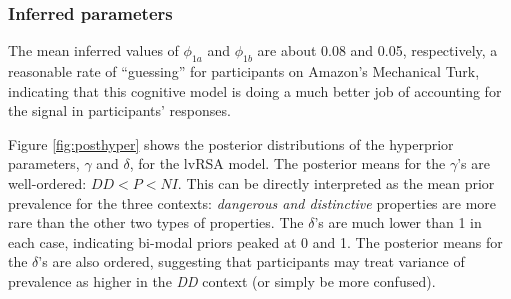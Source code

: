 \documentclass[10pt,letterpaper]{article}
\begin{document}



\subsubsection{Inferred parameters}
The mean inferred values of  $\phi_{1a}$ and $\phi_{1b}$ are about 0.08 and 0.05, respectively, a reasonable rate of ``guessing'' for participants on Amazon's Mechanical Turk, indicating that this cognitive model is doing a much better job of accounting for the signal in participants' responses.




Figure \ref{fig:posthyper} shows the posterior distributions of the hyperprior parameters, $\gamma$ and $\delta$, for the lvRSA model. The posterior means for the $\gamma$'s are well-ordered: $DD < P < NI$. This can be directly interpreted as the mean prior prevalence for the three contexts: \emph{dangerous and distinctive} properties are more rare than the other two types of properties. 
The $\delta$'s are much lower than 1 in each case, indicating bi-modal priors peaked at 0 and 1.
The posterior means for the $\delta$'s are also ordered, suggesting that participants may treat variance of prevalence as higher in the \emph{DD} context (or simply be more confused).




\end{document}
